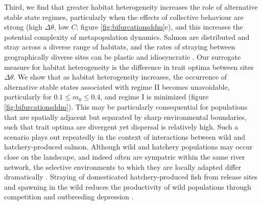 \documentclass{revtex4}
\begin{document}
Third, we find that greater habitat heterogeneity increases the role of alternative stable state regimes, particularly when the effects of collective behaviour are strong (high $\Delta\theta$, low $C$; figure \ref{fig:bifurcationsddm}c), and this increases the potential complexity of metapopulation dynamics.
Salmon are distributed and stray across a diverse range of habitats, and the rates of straying between geographically diverse sites can be plastic and idiosyncratic \citep{Westley:2015to}.
Our surrogate measure for habitat heterogeneity is the difference in trait optima between sites $\Delta\theta$.
We show that as habitat heterogeneity increases, the occurrence of alternative stable states associated with regime II becomes unavoidable, particularly for $0.1 \leq m_0 \leq 0.4$, and regime I is minimized (figure \ref{fig:bifurcationsddm}).
This may be particularly consequential for populations that are spatially adjacent but separated by sharp environmental boundaries, such that trait optima are divergent yet dispersal is relatively high.
Such a scenario plays out repeatedly in the context of interactions between wild and hatchery-produced salmon. 
Although wild and hatchery populations may occur close on the landscape, and indeed often are sympatric within the same river network, the selective environments to which they are locally adapted differ dramatically \citep{Christie:2012bj}. 
Straying of domesticated hatchery-produced fish from release sites and spawning in the wild reduces the productivity of wild populations through competition and outbreeding depression \citep{Chilcote:2003bb,Araki:2007cm}.
\end{document}
